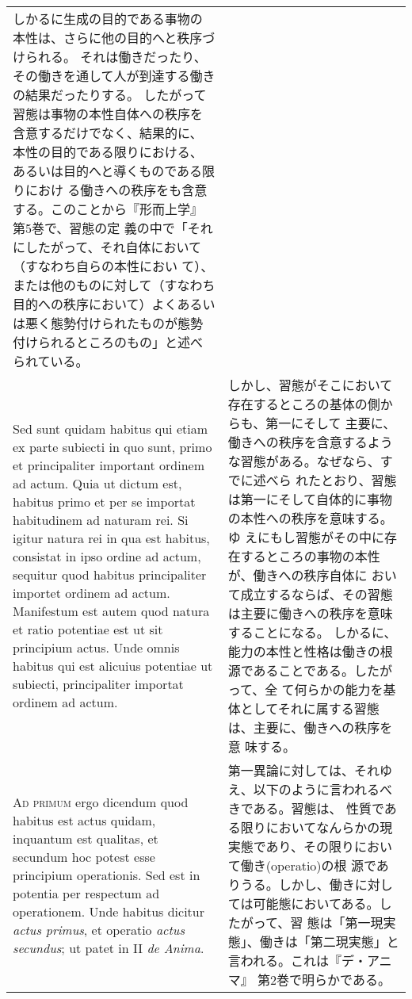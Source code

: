\documentclass[10pt]{jsarticle} %
\begin{document}
\begin{longtable}{p{21em}p{21em}}
しかるに生成の目的である事物の本性は、さらに他の目的へと秩序づけられる。
それは働きだったり、その働きを通して人が到達する働きの結果だったりする。
したがって習態は事物の本性自体への秩序を含意するだけでなく、結果的に、
本性の目的である限りにおける、あるいは目的へと導くものである限りにおけ
る働きへの秩序をも含意する。このことから『形而上学』第5巻で、習態の定
義の中で「それにしたがって、それ自体において（すなわち自らの本性におい
て）、または他のものに対して（すなわち目的への秩序において）よくあるい
は悪く態勢付けられたものが態勢付けられるところのもの」と述べられている。


\\


Sed sunt quidam habitus qui
etiam ex parte subiecti in quo sunt, primo et principaliter important
ordinem ad actum. Quia ut dictum est, habitus primo et per se importat
habitudinem ad naturam rei. Si igitur natura rei in qua est habitus,
consistat in ipso ordine ad actum, sequitur quod habitus principaliter
importet ordinem ad actum. Manifestum est autem quod natura et ratio
potentiae est ut sit principium actus. Unde omnis habitus qui est
alicuius potentiae ut subiecti, principaliter importat ordinem ad
actum.

&

しかし、習態がそこにおいて存在するところの基体の側からも、第一にそして
主要に、働きへの秩序を含意するような習態がある。なぜなら、すでに述べら
れたとおり、習態は第一にそして自体的に事物の本性への秩序を意味する。ゆ
えにもし習態がその中に存在するところの事物の本性が、働きへの秩序自体に
おいて成立するならば、その習態は主要に働きへの秩序を意味することになる。
しかるに、能力の本性と性格は働きの根源であることである。したがって、全
て何らかの能力を基体としてそれに属する習態は、主要に、働きへの秩序を意
味する。

\\



{\scshape Ad primum} ergo dicendum quod habitus est actus quidam, inquantum est
qualitas, et secundum hoc potest esse principium operationis. Sed est
in potentia per respectum ad operationem. Unde habitus dicitur {\itshape actus
primus}, et operatio {\itshape actus secundus}; ut patet in II {\itshape de Anima}.

&

第一異論に対しては、それゆえ、以下のように言われるべきである。習態は、
性質である限りにおいてなんらかの現実態であり、その限りにおいて働き(operatio)の根
源でありうる。しかし、働きに対しては可能態においてある。したがって、習
態は「第一現実態」、働きは「第二現実態」と言われる。これは『デ・アニマ』
第2巻で明らかである。


\end{longtable}
\end{document}

